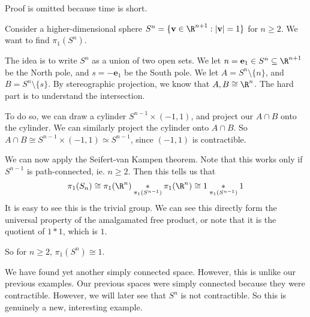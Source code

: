 \documentclass[a4paper]{article}
\begin{document}
Proof is omitted because time is short.

\begin{eg}
  Consider a higher-dimensional sphere $S^n = \{\mathbf{v} \in \R^{n + 1}: |\mathbf{v}| = 1\}$ for $n \geq 2$. We want to find $\pi_1(S^n)$.

  The idea is to write $S^n$ as a union of two open sets. We let $n = \mathbf{e}_1 \in S^n \subseteq \R^{n + 1}$ be the North pole, and $s = -\mathbf{e}_1$ be the South pole. We let $A = S^n \setminus \{n\}$, and $B = S^n \setminus\{s\}$. By stereographic projection, we know that $A, B \cong \R^n$. The hard part is to understand the intersection.

  To do so, we can draw a cylinder $S^{n - 1} \times (-1, 1)$, and project our $A\cap B$ onto the cylinder. We can similarly project the cylinder onto $A\cap B$. So $A\cap B\cong S^{n - 1} \times (-1, 1) \simeq S^{n - 1}$, since $(-1, 1)$ is contractible.
  \begin{center}
  \end{center}
  We can now apply the Seifert-van Kampen theorem. Note that this works only if $S^{n - 1}$ is path-connected, ie. $n \geq 2$. Then this tells us that
  \[
    \pi_1(S_n) \cong \pi_1(\R^n) \underset{\pi_1(S^{n - 1})}{*} \pi_1(\R^n) \cong 1 \underset{\pi_1(S^{n - 1})}{*} 1
  \]
  It is easy to see this is the trivial group. We can see this directly form the universal property of the amalgamated free product, or note that it is the quotient of $1 * 1$, which is $1$.

  So for $n \geq 2$, $\pi_1(S^n) \cong 1$.
\end{eg}
We have found yet another simply connected space. However, this is unlike our previous examples. Our previous spaces were simply connected because they were contractible. However, we will later see that $S^n$ is not contractible. So this is genuinely a new, interesting example.
\end{document}
